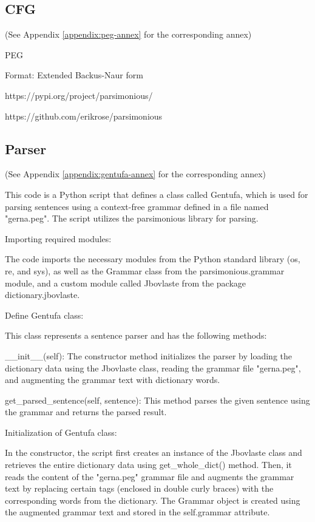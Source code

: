 \subsection{CFG}
\label{sub:cfg}

(See Appendix \ref{appendix:peg-annex} for the corresponding annex)

PEG

Format: Extended Backus-Naur form

https://pypi.org/project/parsimonious/

https://github.com/erikrose/parsimonious


\subsection{Parser}
\label{sub:parser}

(See Appendix \ref{appendix:gentufa-annex} for the corresponding annex)

This code is a Python script that defines a class called Gentufa, which is used for parsing sentences using a context-free grammar defined in a file named "gerna.peg". The script utilizes the parsimonious library for parsing.

Importing required modules:

The code imports the necessary modules from the Python standard library (os, re, and sys), as well as the Grammar class from the parsimonious.grammar module, and a custom module called Jbovlaste from the package dictionary.jbovlaste.

Define Gentufa class:

This class represents a sentence parser and has the following methods:

    \_\_init\_\_(self): The constructor method initializes the parser by loading the dictionary data using the Jbovlaste class, reading the grammar file "gerna.peg", and augmenting the grammar text with dictionary words.

    get\_parsed\_sentence(self, sentence): This method parses the given sentence using the grammar and returns the parsed result.

Initialization of Gentufa class:

In the constructor, the script first creates an instance of the Jbovlaste class and retrieves the entire dictionary data using get\_whole\_dict() method. Then, it reads the content of the "gerna.peg" grammar file and augments the grammar text by replacing certain tags (enclosed in double curly braces) with the corresponding words from the dictionary. The Grammar object is created using the augmented grammar text and stored in the self.grammar attribute.

